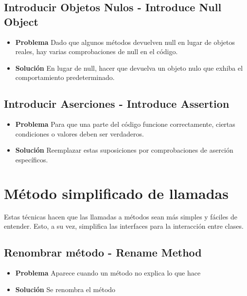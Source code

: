 \documentclass[11pt,a4paper,oneside]{book}
\begin{document}
\subsection{Introducir Objetos Nulos - Introduce Null Object}        
\begin{itemize}
    \item \textbf{Problema} Dado que algunos métodos devuelven null en lugar de objetos reales, hay varias comprobaciones de null en el código.
    
    
    
    \item \textbf{Solución} En lugar de null, hacer que devuelva un objeto nulo que exhiba el comportamiento predeterminado.
    
    
\end{itemize}    

 \subsection{Introducir Aserciones - Introduce Assertion}    
\begin{itemize}
    \item \textbf{Problema} Para que una parte del código funcione correctamente, ciertas condiciones o valores deben ser verdaderos.
    
    
    
    \item \textbf{Solución} Reemplazar estas suposiciones por comprobaciones de aserción específicos.
    
    
\end{itemize}  


\section{Método simplificado de llamadas}

Estas técnicas hacen que las llamadas a métodos sean más simples y fáciles de entender. Esto, a su vez, simplifica las interfaces para la interacción entre clases.

\subsection{Renombrar método - Rename Method}
\label{renombrarmetodo}
\begin{itemize}
    \item \textbf{Problema} Aparece cuando un método no explica lo que hace 
    \item \textbf{Solución} Se renombra el método
\end{itemize}
\end{document}
